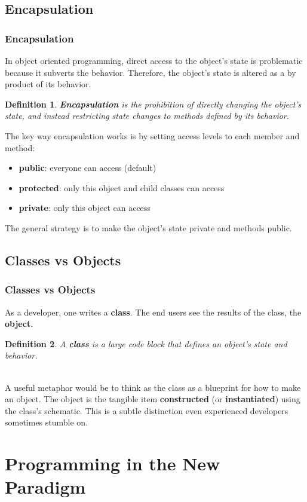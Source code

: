 \documentclass[aspectratio=169]{beamer}
\newtheorem{defn}{Definition}
\begin{document}
\subsection{Encapsulation}
\begin{frame}
\frametitle{Encapsulation}
In object oriented programming, direct access to the object's state is problematic because it subverts the behavior. Therefore, the object's state is altered as a by product of its behavior.

\pause
\begin{defn}
\textbf{Encapsulation} is the prohibition of directly changing the object's state, and instead restricting state changes to methods defined by its behavior.
\end{defn}

\pause
The key way encapsulation works is by setting access levels to each member and method:
\begin{itemize}
	\item \textbf{public}: everyone can access (default)
	\item \textbf{protected}: only this object and child classes can access
	\item \textbf{private}: only this object can access
\end{itemize}
The general strategy is to make the object's state private and methods public.
\end{frame}

\subsection{Classes vs Objects}
\begin{frame}
\frametitle{Classes vs Objects}
As a developer, one writes a \textbf{class}. The end users see the results of the class, the \textbf{object}.

\begin{defn}
A \textbf{class} is a large code block that defines an object's state and behavior.
\end{defn}

\pause
\mbox{}\\
A useful metaphor would be to think as the class as a blueprint for how to make an object. The object is the tangible item \textbf{constructed} (or \textbf{instantiated}) using the class's schematic. This is a subtle distinction even experienced developers sometimes stumble on.
\end{frame}

\section{Programming in the New Paradigm}
\end{document}
